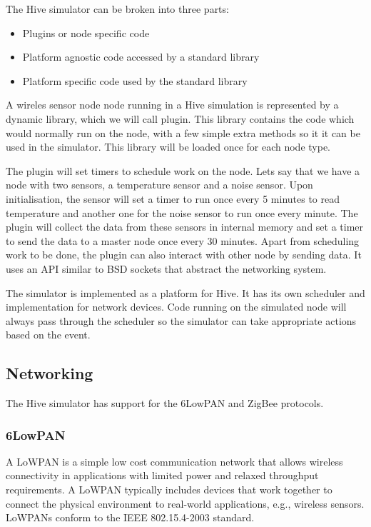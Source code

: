 
The Hive simulator can be broken into three parts:
\begin{itemize}
  \item Plugins or node specific code
  \item Platform agnostic code accessed by a standard library
  \item Platform specific code used by the standard library
\end{itemize}

A wireles sensor node node running in a Hive simulation is 
represented by a dynamic library, which we will call plugin. This library contains the code 
which would normally run on the node, with a few simple extra methods
so it it can be used in the simulator. This library will be loaded once
for each node type.

The plugin will set timers to schedule work on the node. Lets say that we have
a node with two sensors, a temperature sensor and a noise sensor. Upon
initialisation, the sensor will set a timer to run once every 5 minutes to
read temperature and another one for the noise sensor to run once every
minute. The plugin will collect the data from these sensors in internal memory
and set a timer to send the data to a master node once every 30 minutes.
Apart from scheduling work to be done, the plugin can also interact with other
node by sending data. It uses an API similar to BSD sockets that abstract the
networking system.

The simulator is implemented as a platform for Hive. It has its own scheduler
and implementation for network devices. Code running on the simulated node
will always pass through the scheduler so the simulator can take appropriate
actions based on the event.

\subsection{Networking}

The Hive simulator has support for the 6LowPAN and ZigBee protocols.

\subsubsection{6LowPAN\cite{6lowpan}}
A LoWPAN is a simple low cost communication network that allows
wireless connectivity in applications with limited power and relaxed
throughput requirements.  A LoWPAN typically includes devices that
work together to connect the physical environment to real-world
applications, e.g., wireless sensors.  LoWPANs conform to the IEEE
802.15.4-2003 standard.


